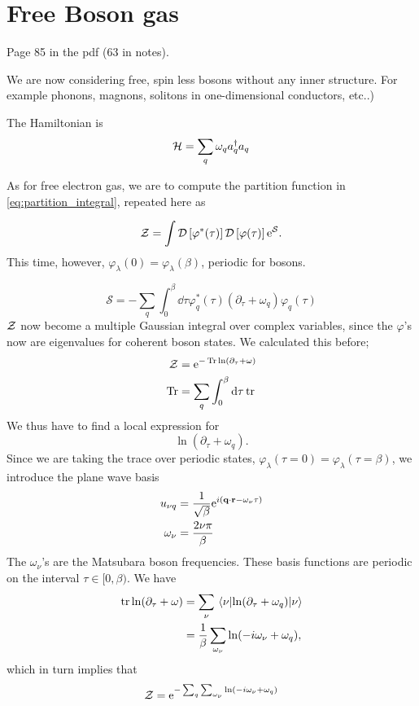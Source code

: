 \section{Free Boson gas}

Page 85 in the pdf (63 in notes).

We are now considering free, spin less bosons without any inner structure. For example phonons, magnons, solitons in one-dimensional conductors, etc..)

The Hamiltonian is 
\begin{equation}
\mathcal{H} = \sum_q \omega_qa_q^\dagger a_q
\end{equation}

As for free electron gas, we are to compute the partition function in \eqref{eq:partition_integral}, repeated here as 

\begin{equation}
\mathcal{Z} = \int \mathcal{D}\left[\varphi^*(\tau)\right]\mathcal{D}\left[\varphi(\tau)\right]\mathrm{e}^{\mathcal{S}}.
\end{equation}
This time, however, $\varphi_\lambda(0) = \varphi_\lambda(\beta)$, periodic for bosons.

\begin{equation}
\mathcal{S} = -\sum_{q}\int_0^\beta\dd{\tau}\varphi_{q}^*(\tau)\left(\partial_{\tau} + \omega_q\right)\varphi_{q}(\tau)
\end{equation}
\(\mathcal{Z}\) now become a multiple Gaussian integral over complex variables, since the $\varphi$'s now are eigenvalues for coherent boson states. We calculated this before;
\begin{align*}
\mathcal{Z} &= \mathrm{e}^{-\Tr\ln(\partial_\tau + \omega)} \\
\Tr &= \sum_q\int_0^\beta\dd{\tau}\tr
\end{align*}
We thus have to find a local expression for 
\begin{equation}
\ln(\partial_\tau + \omega_q).
\end{equation}
Since we are taking the trace over periodic states, \(\varphi_\lambda(\tau =0) = \varphi_\lambda(\tau =\beta)\), we introduce the plane wave basis
\begin{align*}
u_{\nu q} &= \frac{1}{\sqrt{\beta}}\mathrm{e}^{i(\vb q\cdot \vb{r} - \omega_\nu\tau)}\\
\omega_\nu &= \frac{2\nu\pi}{\beta}
\end{align*}
The \(\omega_\nu\)'s are the Matsubara boson frequencies. These basis functions are periodic on the interval \( \tau \in [0,\beta) \).
We have
\begin{align*}
\tr\ln(\partial_\tau + \omega) &= \sum_\nu \ev{\ln(\partial_\tau + \omega_q)}{\nu}\\
&=\frac{1}{\beta}\sum_{\omega_\nu}\ln(-i\omega_\nu + \omega_q),
\end{align*}
which in turn implies that
\begin{equation}
\label{eq:boson_partition}
\mathcal{Z} = \mathrm{e}^{-\sum_{q}\sum_{\omega_\nu}\ln(-i\omega_\nu+\omega_q)}
\end{equation}

